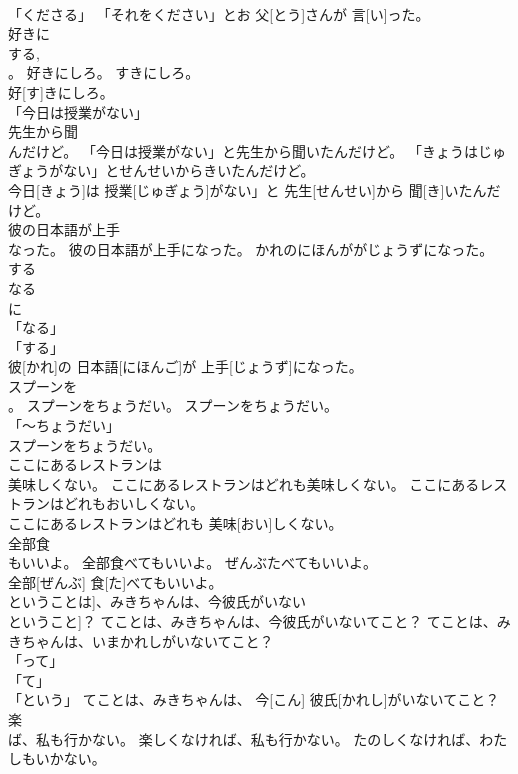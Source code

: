 \documentclass[8pt]{extreport}
\begin{document}
\begin{CJK}{UTF8}{min}
\\	「くださる」	「それをください」とお 父[とう]さんが 言[い]った。		
\\	好きに
\\	する, 
\\	。	好きにしろ。	すきにしろ。	
\\	好[す]きにしろ。		
\\	「今日は授業がない」
\\	先生から聞
\\	んだけど。	「今日は授業がない」と先生から聞いたんだけど。	「きょうはじゅぎょうがない」とせんせいからきいたんだけど。	
\\	今日[きょう]は 授業[じゅぎょう]がない」と 先生[せんせい]から 聞[き]いたんだけど。		
\\	彼の日本語が上手
\\	なった。	彼の日本語が上手になった。	かれのにほんががじょうずになった。	
\\	する 
\\	なる 
\\	に 
\\	「なる」 
\\	「する」 
\\	彼[かれ]の 日本語[にほんご]が 上手[じょうず]になった。		
\\	スプーンを
\\	。	スプーンをちょうだい。	スプーンをちょうだい。	
\\	「～ちょうだい」 
\\	スプーンをちょうだい。		
\\	ここにあるレストランは
\\	美味しくない。	ここにあるレストランはどれも美味しくない。	ここにあるレストランはどれもおいしくない。	
\\	ここにあるレストランはどれも 美味[おい]しくない。		
\\	全部食
\\	もいいよ。	全部食べてもいいよ。	ぜんぶたべてもいいよ。	
\\	全部[ぜんぶ] 食[た]べてもいいよ。		
\\	ということは]、みきちゃんは、今彼氏がいない
\\	ということ]？	てことは、みきちゃんは、今彼氏がいないてこと？	てことは、みきちゃんは、いまかれしがいないてこと？	
\\	「って」 
\\	「て」 
\\	「という」	てことは、みきちゃんは、 今[こん] 彼氏[かれし]がいないてこと？		
\\	楽
\\	ば、私も行かない。	楽しくなければ、私も行かない。	たのしくなければ、わたしもいかない。	

\end{CJK}
\end{document}
